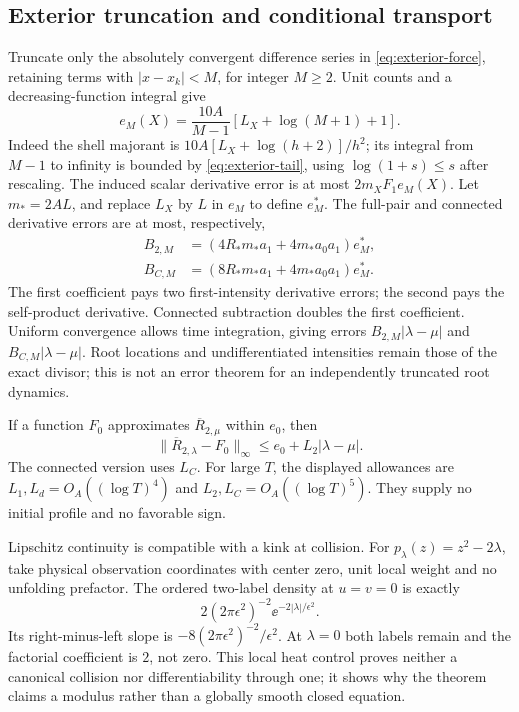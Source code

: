 \subsection{Exterior truncation and conditional transport}

Truncate only the absolutely convergent difference series in
\eqref{eq:exterior-force}, retaining terms with $|x-x_k|<M$, for
integer $M\ge2$. Unit counts and a decreasing-function integral give
\begin{equation}\label{eq:exterior-tail}
 e_M(X)=\frac{10A}{M-1}[L_X+\log(M+1)+1].
\end{equation}
Indeed the shell majorant is
$10A[L_X+\log(h+2)]/h^2$; its integral from $M-1$ to infinity
is bounded by \eqref{eq:exterior-tail}, using
$\log(1+s)\le s$ after rescaling. The induced scalar derivative
error is at most $2m_XF_1e_M(X)$.
Let $m_*=2AL$, and replace $L_X$ by $L$ in $e_M$ to define $e_M^*$.
The full-pair and connected derivative errors are at most, respectively,
\begin{align}
 B_{2,M}&=(4R_*m_*a_1+4m_*a_0a_1)e_M^*,\nonumber\\
 B_{C,M}&=(8R_*m_*a_1+4m_*a_0a_1)e_M^*.
                                                        \label{eq:pair-exterior-error}
\end{align}
The first coefficient pays two first-intensity derivative errors;
the second pays the self-product derivative. Connected subtraction
doubles the first coefficient. Uniform convergence allows time
integration, giving errors $B_{2,M}|\lambda-\mu|$ and
$B_{C,M}|\lambda-\mu|$. Root locations and undifferentiated intensities
remain those of the exact divisor; this is not an error theorem for
an independently truncated root dynamics.

If a function $F_0$ approximates $\overline R_{2,\mu}$ within $e_0$,
then
\begin{equation}\label{eq:initial-transport}
 \|\overline R_{2,\lambda}-F_0\|_\infty
       \le e_0+L_2|\lambda-\mu|.
\end{equation}
The connected version uses $L_C$. For large $T$, the displayed allowances
are $L_1,L_d=O_A((\log T)^4)$ and $L_2,L_C=O_A((\log T)^5)$.
They supply no initial profile and no favorable sign.

Lipschitz continuity is compatible with a kink at collision. For
$p_\lambda(z)=z^2-2\lambda$, take physical observation coordinates
with center zero, unit local weight and no unfolding prefactor.
The ordered two-label density at $u=v=0$ is exactly
\[
 2(2\pi\epsilon^2)^{-2}\ee^{-2|\lambda|/\epsilon^2}.
\]
Its right-minus-left slope is
$-8(2\pi\epsilon^2)^{-2}/\epsilon^2$. At $\lambda=0$ both labels
remain and the factorial coefficient is $2$, not zero. This local
heat control proves neither a canonical collision nor differentiability
through one; it shows why the theorem claims a modulus rather than a
globally smooth closed equation.
